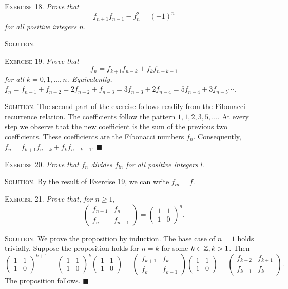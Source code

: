 \documentclass[11pt, leqno]{article}
\newcommand{\done}{\ensuremath{\blacksquare}}
\begin{document}
\textsc{Exercise 18}. \emph{Prove that 
\begin{displaymath}
f_{n+1}f_{n-1} - f_n^2 = (-1)^n
\end{displaymath}
for all positive integers $n$.}

\textsc{Solution}.

\textsc{Exercise 19}. \emph{Prove that 
\begin{displaymath}
f_n = f_{k+1}f_{n-k} + f_kf_{n-k-1}
\end{displaymath}
for all $k=0,1,\ldots, n$. Equivalently, $f_n = f_{n-1} + f_{n-2} = 2f_{n-2} + f_{n-3} = 3f_{n-3} + 2f_{n-4} = 5f_{n-4} + 3f_{n-5} \cdots$.}

\textsc{Solution}. The second part of the exercise follows readily from the Fibonacci recurrence relation. The coefficients follow the pattern $1, 1, 2, 3, 5, \ldots$. At every step we observe that the new coefficient is the sum of the previous two coefficients. These coefficients are the Fibonacci numbers $f_n$. Consequently, $f_n = f_{k+1}f_{n-k} + f_kf_{n-k-1}$. \done

\textsc{Exercise 20}. \emph{Prove that $f_n$ divides $f_{ln}$ for all positive integers $l$.}

\textsc{Solution}. By the result of Exercise 19, we can write $f_{ln} = f$.

\textsc{Exercise 21}. \emph{Prove that, for $n\geq 1$, 
\begin{displaymath}
\begin{pmatrix} f_{n+1} & f_n \\ f_n & f_{n-1} \end{pmatrix} = \begin{pmatrix} 1 & 1 \\ 1 & 0 \end{pmatrix}^n.
\end{displaymath}}

\textsc{Solution}. We prove the proposition by induction. The base case of $n=1$ holds trivially. Suppose the proposition holds for $n=k$ for some $k\in\mathbb{Z}, k>1$. Then 
\begin{displaymath}
\begin{pmatrix} 1 & 1 \\ 1 & 0 \end{pmatrix}^{k+1} = \begin{pmatrix} 1 & 1 \\ 1 & 0 \end{pmatrix}^k \begin{pmatrix} 1 & 1 \\ 1 & 0 \end{pmatrix} = \begin{pmatrix} f_{k+1} & f_k \\ f_k & f_{k-1} \end{pmatrix} \begin{pmatrix} 1 & 1 \\ 1 & 0 \end{pmatrix} = \begin{pmatrix} f_{k+2} & f_{k+1} \\ f_{k+1} & f_k \end{pmatrix}.
\end{displaymath}
The proposition follows. \done
\end{document}
